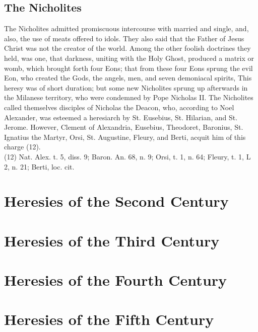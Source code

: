 \documentclass[12pt]{book}
\begin{document}
\section{The Nicholites}
The Nicholites admitted promiscuous intercourse with married and single, and, also, the use of meats
offered to idols. They also said that the Father of Jesus Christ was not the creator of the world. Among the
other foolish doctrines they held, was one, that darkness, uniting with the Holy Ghost, produced a matrix
or womb, which brought forth four Eons; that from these four Eons sprung the evil Eon, who created the
Gods, the angels, men, and seven demoniacal spirits, This heresy was of short duration; but some new
Nicholites sprung up afterwards in the Milanese territory, who were condemned by Pope Nicholas II.
The Nicholites called themselves disciples of Nicholas the Deacon, who, according to Noel Alexander,
was esteemed a heresiarch by St. Eusebius, St. Hilarian, and St. Jerome. However, Clement of Alexandria,
Eusebius, Theodoret, Baronius, St. Ignatius the Martyr, Orsi, St. Augustine, Fleury, and Berti, acquit him
of this charge (12).\\
(12) Nat. Alex. t. 5, diss. 9; Baron. An. 68, n. 9; Orsi, t. 1, n. 64; Fleury, t. 1, L 2, n. 21; Berti, loc. cit.\\

\chapter{Heresies of the Second Century}
\chapter{Heresies of the Third Century}
\chapter{Heresies of the Fourth Century}
\chapter{Heresies of the Fifth Century}
\end{document}
